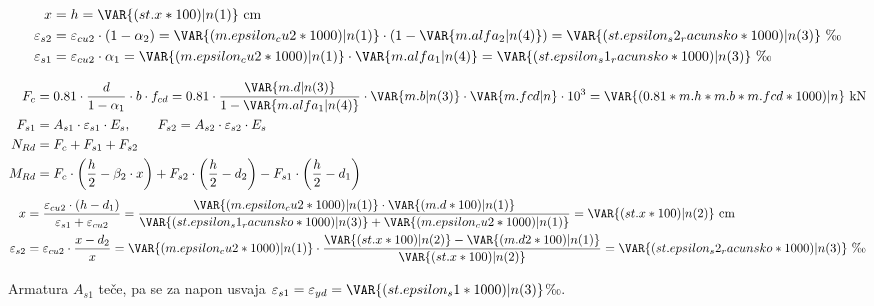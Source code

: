 \begin{align*}
x &= h = \VAR{(st.x*100)|n(1)} \ \mathrm{cm} \\
\varepsilon_{s2} &= \varepsilon_{cu2} \cdot (1 - \alpha_2) = \VAR{(m.epsilon_cu2*1000)|n(1)} \cdot (1 - \VAR{m.alfa_2|n(4)}) = \VAR{(st.epsilon_s2_racunsko*1000)|n(3)} \ \text{‰} \\
\varepsilon_{s1} &= \varepsilon_{cu2} \cdot \alpha_1 = \VAR{(m.epsilon_cu2*1000)|n(1)} \cdot \VAR{m.alfa_1|n(4)} = \VAR{(st.epsilon_s1_racunsko*1000)|n(3)} \ \text{‰}
\end{align*}


\begin{align*}
F_c &= 0.81 \cdot \frac{d}{1 - \alpha_1} \cdot b \cdot f_{cd} = 0.81 \cdot \frac{\VAR{m.d|n(3)}}{1 - \VAR{m.alfa_1|n(4)}} \cdot \VAR{m.b|n(3)} \cdot \VAR{m.fcd|n} \cdot 10^3 = \VAR{(0.81 * m.h * m.b * m.fcd * 1000)|n} \ \mathrm{kN} \\
F_{s1} &= A_{s1} \cdot \varepsilon_{s1} \cdot E_s, \qquad F_{s2} = A_{s2} \cdot \varepsilon_{s2} \cdot E_s \\
N_{Rd} &= F_c + F_{s1} + F_{s2} \\
M_{Rd} &= F_c \cdot \left(\frac{h}{2} - \beta_2 \cdot x\right) + F_{s2} \cdot \left(\frac{h}{2} - d_2\right) - F_{s1} \cdot \left(\frac{h}{2} - d_1\right)
\end{align*}
\begin{align*}
x &= \frac{\varepsilon_{cu2} \cdot (h - d_1)}{\varepsilon_{s1} + \varepsilon_{cu2}} = \frac{\VAR{(m.epsilon_cu2*1000)|n(1)} \cdot \VAR{(m.d*100)|n(1)}}{\VAR{(st.epsilon_s1_racunsko*1000)|n(3)} + \VAR{(m.epsilon_cu2*1000)|n(1)}} = \VAR{(st.x*100)|n(2)} \ \mathrm{cm} \\
\varepsilon_{s2} &= \varepsilon_{cu2} \cdot \frac{x - d_2}{x} = \VAR{(m.epsilon_cu2*1000)|n(1)} \cdot \frac{\VAR{(st.x*100)|n(2)} - \VAR{(m.d2*100)|n(1)}}{\VAR{(st.x*100)|n(2)}} = \VAR{(st.epsilon_s2_racunsko*1000)|n(3)} \ \text{‰}
\end{align*}

Armatura $A_{s1}$ teče, pa se za napon usvaja $\varepsilon_{s1} = \varepsilon_{yd} = \VAR{(st.epsilon_s1*1000)|n(3)}$‰.

